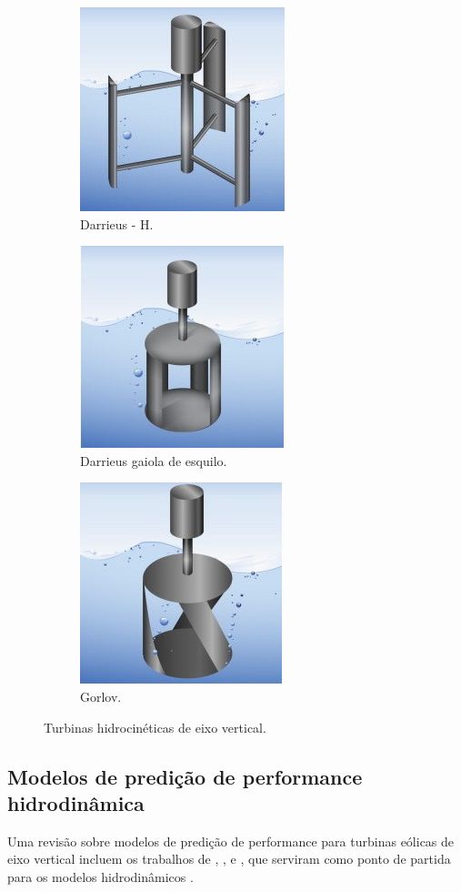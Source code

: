 \begin{figure}
\begin{subfigure}{0.31\textwidth}
		\centering
		\includegraphics[scale=0.9]{figuras/VermaakVc.jpg}
		\caption{Darrieus - H.}
		\label{subfig:DarrieusH}
	\end{subfigure}	
	\begin{subfigure}{0.31\textwidth}
		\centering
		\includegraphics[scale=0.9]{figuras/VermaakVb.jpg}
		\caption{Darrieus gaiola de esquilo.}
		\label{subfig:SquirrelcageDarrieus}
	\end{subfigure}
	\begin{subfigure}{0.31\textwidth}
		\centering
		\includegraphics[scale=0.9]{figuras/VermaakVe.jpg}
		\caption{Gorlov.}
		\label{subfig:Gorlov}
	\end{subfigure}	
	\caption{Turbinas hidrocinéticas de eixo vertical.}
	\label{fig:Behrouzi2014-2}
\end{figure}

\subsection{Modelos de predição de performance hidrodinâmica}

Uma revisão sobre modelos de predição de performance para turbinas eólicas de eixo vertical incluem os trabalhos de , ,  e ,  que serviram como ponto de partida para os modelos hidrodinâmicos \cite{Dai2011}. 
